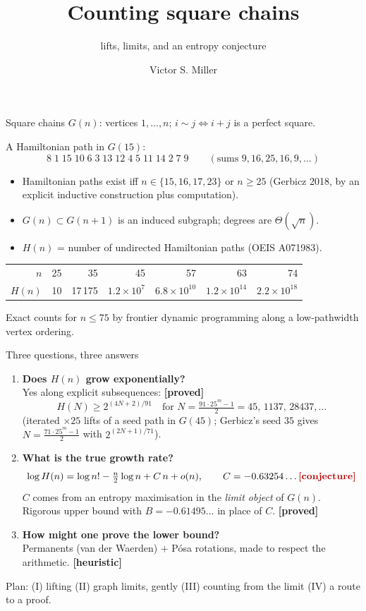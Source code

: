 \documentclass[11pt,aspectratio=169]{beamer}
\title{Counting square chains}
\subtitle{lifts, limits, and an entropy conjecture}
\author{Victor S. Miller}
\date{}
\newcommand{\Ham}{H}
\newcommand{\proved}{\textcolor{green!50!black}{\textbf{[proved]}}}
\newcommand{\conj}{\textcolor{red!70!black}{\textbf{[conjecture]}}}
\newcommand{\heur}{\textcolor{orange!80!black}{\textbf{[heuristic]}}}
\begin{document}
\begin{frame}
\titlepage
\end{frame}

\begin{frame}{Square chains}
$G(n)$: vertices $1,\dots,n$; \quad $i\sim j \iff i+j$ is a perfect square.

\medskip
A Hamiltonian path in $G(15)$:
\[
8\;1\;15\;10\;6\;3\;13\;12\;4\;5\;11\;14\;2\;7\;9
\qquad(\text{sums }9,16,25,16,9,\dots)
\]

\begin{itemize}
\item Hamiltonian paths exist iff $n\in\{15,16,17,23\}$ or $n\ge 25$
 (Gerbicz 2018, by an explicit inductive construction plus computation).
\item $G(n)\subset G(n+1)$ is an induced subgraph; degrees are $\Theta(\sqrt n)$.
\item $\Ham(n)$ = number of undirected Hamiltonian paths (OEIS A071983).
\end{itemize}

\medskip
\begin{center}
\begin{tabular}{rrrrrrr}
\toprule
$n$ & 25 & 35 & 45 & 57 & 63 & 74\\
$\Ham(n)$ & 10 & 17\,175 & $1.2\times10^{7}$ & $6.8\times10^{10}$ & $1.2\times10^{14}$ & $2.2\times10^{18}$\\
\bottomrule
\end{tabular}
\end{center}
{\footnotesize Exact counts for $n\le 75$ by frontier dynamic programming along a
low-pathwidth vertex ordering.}
\end{frame}

\begin{frame}{Three questions, three answers}
\small
\begin{enumerate}
\item \textbf{Does $\Ham(n)$ grow exponentially?}\\
 Yes along explicit subsequences: \proved
 \[\Ham(N)\ge 2^{(4N+2)/91}\quad\text{for } N=\tfrac{91\cdot 25^m-1}{2}=45,\,1137,\,28437,\dots\]
 (iterated $\times25$ lifts of a seed path in $G(45)$; Gerbicz's seed $35$ gives
 $N=\frac{71\cdot25^m-1}2$ with $2^{(2N+1)/71}$).
\item \textbf{What is the true growth rate?}
 \[
 \log \Ham(n)=\log n!-\tfrac n2\log n + C\,n + o(n),\qquad C=-0.63254\ldots \conj
 \]
 $C$ comes from an entropy maximisation in the \emph{limit object} of $G(n)$.
 Rigorous upper bound with $B=-0.61495\ldots$ in place of $C$. \proved
\item \textbf{How might one prove the lower bound?}\\
 Permanents (van der Waerden) $+$ Pósa rotations, made to respect the arithmetic. \heur
\end{enumerate}
\medskip
Plan: (I) lifting \quad (II) graph limits, gently \quad (III) counting from the limit
\quad (IV) a route to a proof.
\end{frame}
\end{document}
